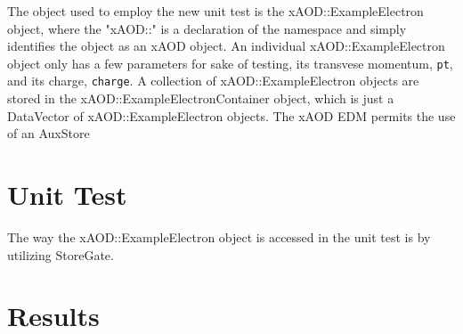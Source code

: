 The object used to employ the new unit test is the xAOD::ExampleElectron object, where the "xAOD::" is a declaration of the namespace and simply identifies the object as an xAOD object.
An individual xAOD::ExampleElectron object only has a few parameters for sake of testing, its transvese momentum, \verb|pt|, and its charge, \verb|charge|.
A collection of xAOD::ExampleElectron objects are stored in the xAOD::ExampleElectronContainer object, which is just a DataVector of xAOD::ExampleElectron objects.
The xAOD EDM permits the use of an AuxStore

\section{Unit Test}

The way the xAOD::ExampleElectron object is accessed in the unit test is by utilizing StoreGate. 

\section{Results}
